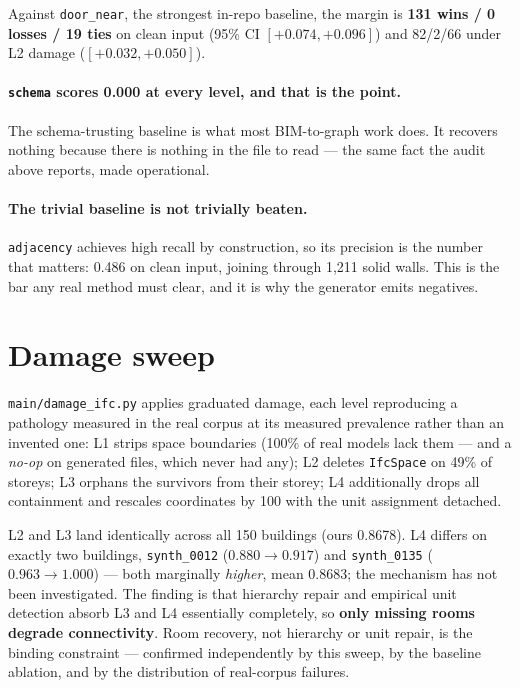 \documentclass[11pt,a4paper]{article}
\begin{document}
Against \texttt{door\_near}, the strongest in-repo baseline, the margin is
\textbf{131 wins / 0 losses / 19 ties} on clean input (95\% CI
$[+0.074,+0.096]$) and 82/2/66 under L2 damage ($[+0.032,+0.050]$).

\paragraph{\texttt{schema} scores 0.000 at every level, and that is the point.}
The schema-trusting baseline is what most BIM-to-graph work does. It recovers
nothing because there is nothing in the file to read --- the same fact the
audit above reports, made operational.

\paragraph{The trivial baseline is not trivially beaten.} \texttt{adjacency}
achieves high recall by construction, so its precision is the number that
matters: 0.486 on clean input, joining through 1{,}211 solid walls. This is the
bar any real method must clear, and it is why the generator emits negatives.

\section{Damage sweep}

\texttt{main/damage\_ifc.py} applies graduated damage, each level reproducing a
pathology measured in the real corpus at its measured prevalence rather than an
invented one: L1 strips space boundaries (100\% of real models lack them --- and
a \emph{no-op} on generated files, which never had any); L2 deletes
\texttt{IfcSpace} on 49\% of storeys; L3 orphans the survivors from their
storey; L4 additionally drops all containment and rescales coordinates by 100
with the unit assignment detached.

L2 and L3 land identically across all 150 buildings (ours 0.8678). L4 differs on
exactly two buildings, \texttt{synth\_0012} ($0.880\!\to\!0.917$) and
\texttt{synth\_0135} ($0.963\!\to\!1.000$) --- both marginally \emph{higher},
mean 0.8683; the mechanism has not been investigated. The finding is that
hierarchy repair and empirical unit detection absorb L3 and L4 essentially
completely, so \textbf{only missing rooms degrade connectivity}. Room recovery,
not hierarchy or unit repair, is the binding constraint --- confirmed
independently by this sweep, by the baseline ablation, and by the distribution
of real-corpus failures.
\end{document}
